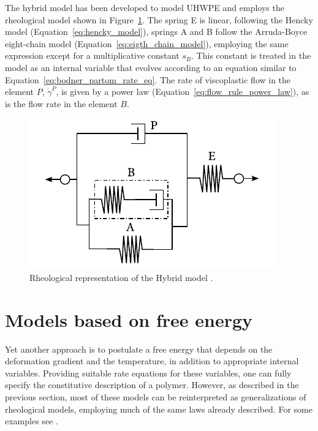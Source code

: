 The hybrid model has been developed to model UHWPE \citep{bergstromConstitutiveModelingUltrahigh2002, bergstromPredictionMultiaxialMechanical2003} and employs the rheological model shown in Figure~\ref{fig:hybrid_model}.
The spring E is linear, following the Hencky model (Equation~\eqref{eq:hencky_model}), springs A and B follow the Arruda-Boyce eight-chain model (Equation~\eqref{eq:eigth_chain_model}), employing the same expression except for a multiplicative constant $s_B$.
This constant is treated in the model as an internal variable that evolves according to an equation similar to Equation~\eqref{eq:bodner_partom_rate_eq}.
The rate of viscoplastic flow in the element $P$, $\dot\gamma^P$, is given by a power law (Equation~\eqref{eq:flow_rule_power_law}), as is the flow rate in the element $B$.
\begin{figure}[hbtp]
  \centering
	\includegraphics{figures/hybrid_model}
	\caption{Rheological representation of the Hybrid model \citep{bergstromConstitutiveModelingUltrahigh2002, bergstromPredictionMultiaxialMechanical2003}.}
\label{fig:hybrid_model}
\end{figure}

\section{Models based on free energy}

Yet another approach is to postulate a free energy that depends on the deformation gradient and the temperature, in addition to appropriate internal variables.
Providing suitable rate equations for these variables, one can fully specify the constitutive description of a polymer.
However, as described in the previous section, most of these models can be reinterpreted as generalizations of rheological models, employing much of the same laws already described.
For some examples see \cite{anandTheoryAmorphousSolids2003, ghorbelViscoplasticConstitutiveModel2008,anandThermomechanicallyCoupledTheory2009, amesThermomechanicallyCoupledTheory2009, pouriayevaliConstitutiveDescriptionRatesensitive2013}.

